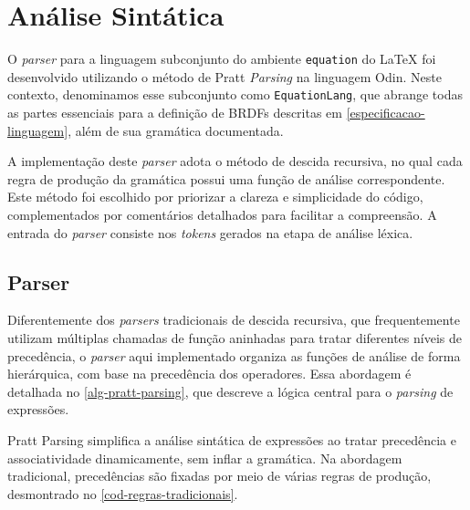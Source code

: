 
\section{Análise Sintática} \label{section-parser}

O \textit{parser} para a linguagem subconjunto do ambiente \verb|equation| do \LaTeX{} foi desenvolvido utilizando o método de Pratt \textit{Parsing} na linguagem Odin. Neste contexto, denominamos esse subconjunto como \texttt{EquationLang}, que abrange todas as partes essenciais para a definição de BRDFs descritas em \autoref{especificacao-linguagem}, além de sua gramática documentada.

A implementação deste \textit{parser} adota o método de descida recursiva, no qual cada regra de produção da gramática possui uma função de análise correspondente. Este método foi escolhido por priorizar a clareza e simplicidade do código, complementados por comentários detalhados para facilitar a compreensão. A entrada do \textit{parser} consiste nos \textit{tokens} gerados na etapa de análise léxica.


\subsection{Parser}

Diferentemente dos \textit{parsers} tradicionais de descida recursiva, que frequentemente utilizam múltiplas chamadas de função aninhadas para tratar diferentes níveis de precedência, o \textit{parser} aqui implementado organiza as funções de análise de forma hierárquica, com base na precedência dos operadores. Essa abordagem é detalhada no \autoref{alg-pratt-parsing}, que descreve a lógica central para o \textit{parsing} de expressões.

Pratt Parsing simplifica a análise sintática de expressões ao tratar precedência e associatividade dinamicamente, sem inflar a gramática. Na abordagem tradicional, precedências são fixadas por meio de várias regras de produção, desmontrado no \autoref{cod-regras-tradicionais}.

